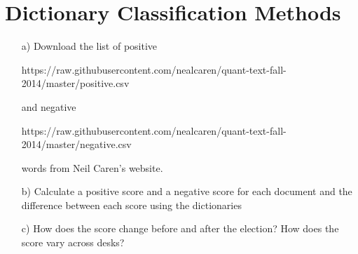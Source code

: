 \documentclass[12pt,letterpaper]{article}
\begin{document}

\section{Dictionary Classification Methods}
\begin{itemize}
\item[a)] Download the list of positive

\begin{small}
 https://raw.githubusercontent.com/nealcaren/quant-text-fall-2014/master/positive.csv
 \end{small}
 and negative 

\begin{small}
 https://raw.githubusercontent.com/nealcaren/quant-text-fall-2014/master/negative.csv
\end{small}
   words from Neil Caren's website.

\item[b)] Calculate a positive score and a negative score for each document and the difference between each score using the dictionaries
\item[c)] How does the score change before and after the election?  How does the score vary across desks?
\end{itemize}
\end{document}
